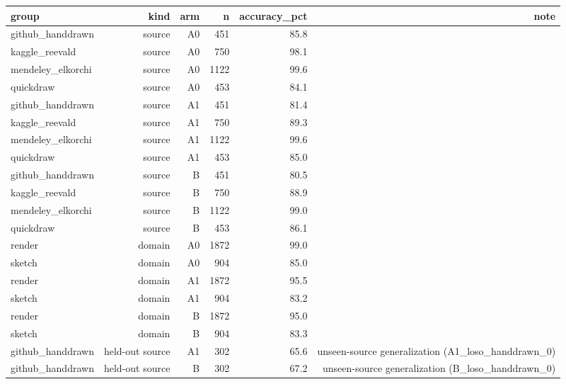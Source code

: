 \begin{tabular}{lrrrrr}
\toprule
group & kind & arm & n & accuracy\_pct & note \\
\midrule
github\_handdrawn & source & A0 & 451 & 85.8 &  \\
kaggle\_reevald & source & A0 & 750 & 98.1 &  \\
mendeley\_elkorchi & source & A0 & 1122 & 99.6 &  \\
quickdraw & source & A0 & 453 & 84.1 &  \\
github\_handdrawn & source & A1 & 451 & 81.4 &  \\
kaggle\_reevald & source & A1 & 750 & 89.3 &  \\
mendeley\_elkorchi & source & A1 & 1122 & 99.6 &  \\
quickdraw & source & A1 & 453 & 85.0 &  \\
github\_handdrawn & source & B & 451 & 80.5 &  \\
kaggle\_reevald & source & B & 750 & 88.9 &  \\
mendeley\_elkorchi & source & B & 1122 & 99.0 &  \\
quickdraw & source & B & 453 & 86.1 &  \\
render & domain & A0 & 1872 & 99.0 &  \\
sketch & domain & A0 & 904 & 85.0 &  \\
render & domain & A1 & 1872 & 95.5 &  \\
sketch & domain & A1 & 904 & 83.2 &  \\
render & domain & B & 1872 & 95.0 &  \\
sketch & domain & B & 904 & 83.3 &  \\
github\_handdrawn & held-out source & A1 & 302 & 65.6 & unseen-source generalization (A1\_loso\_handdrawn\_0) \\
github\_handdrawn & held-out source & B & 302 & 67.2 & unseen-source generalization (B\_loso\_handdrawn\_0) \\
\bottomrule
\end{tabular}
